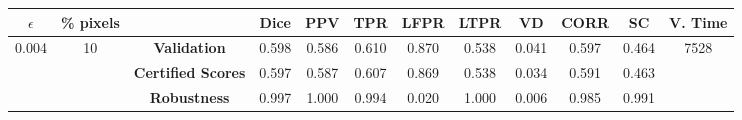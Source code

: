 \begin{longtable}{ c  c | c | c  c  c  c  c  c  c c c}
\toprule \textbf{$\epsilon$} & \textbf{\% pixels} & & \textbf{Dice} & \textbf{PPV} & \textbf{TPR} & \textbf{LFPR} & \textbf{LTPR} & \textbf{VD} & \textbf{CORR} & \textbf{SC} & \textbf{V. Time} \\
\midrule 
\multirow{3}{*}{0.004}  & \multirow{3}{*}{10} &\textbf{Validation} & 0.598 & 0.586 & 0.610 & 0.870 & 0.538 & 0.041 & 0.597 & 0.464 & \multirow{3}{*}{7528} \\
 & & \textbf{Certified Scores} & 0.597 & 0.587 & 0.607 & 0.869 & 0.538 & 0.034 & 0.591 & 0.463 & \\
& & \textbf{Robustness} & 0.997 & 1.000 & 0.994 & 0.020 & 1.000 & 0.006 & 0.985 & 0.991 & \\
\end{longtable}